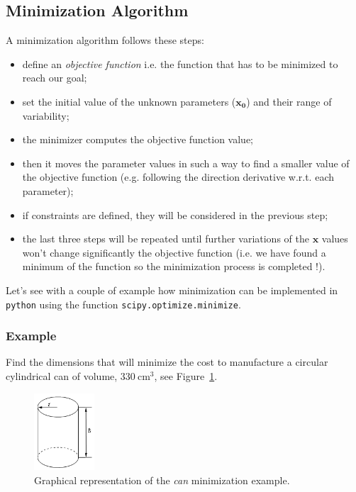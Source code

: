 \subsection{Minimization Algorithm}\label{minimization-algorithm}

A minimization algorithm follows these steps:

\begin{itemize}
\tightlist
\item
  define an \emph{objective function} i.e. the function that has to be
  minimized to reach our goal;
\item
  set the initial value of the unknown parameters (\(\mathbf{x_0}\)) and their range of
  variability;
\item
  the minimizer computes the objective function value;
\item
  then it moves the parameter values in such a way to find a smaller
  value of the objective function (e.g. following the direction derivative w.r.t.
  each parameter);
\item if constraints are defined, they will be considered in the previous step;
\item
  the last three steps will be repeated until further variations of the
  \(\mathbf{x}\) values won't change significantly the objective
  function (i.e. we have found a minimum of the function so the
  minimization process is completed !).
\end{itemize}

Let's see with a couple of example how minimization can be implemented in \texttt{python} using the function \texttt{scipy.optimize.minimize}.

\subsubsection{Example}\label{example}

Find the dimensions that will minimize the cost to
manufacture a circular cylindrical can of volume, \(330~\mathrm{cm}^3\), see Figure~\ref{fig:cylinder}.

\begin{figure}[h]
\centering
\includegraphics[width=0.2\textwidth]{figures/cylinder.png}
\caption{Graphical representation of the \emph{can} minimization example.}
\label{fig:cylinder}
\end{figure}

